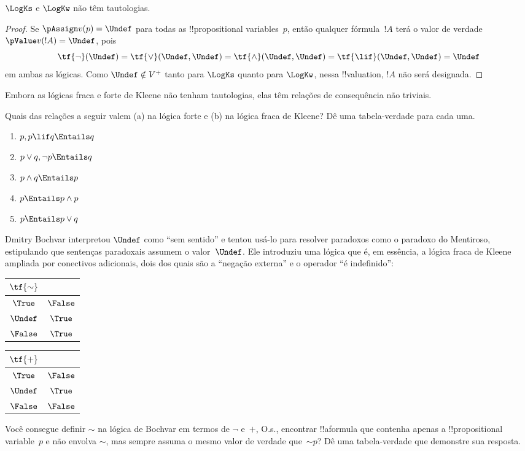 \documentclass[../../../include/open-logic-section]{subfiles}
\begin{document}
\begin{prop}
  $\LogKs$ e $\LogKw$ não têm tautologias.
\end{prop}

\begin{proof}
  Se $\pAssign v(p) = \Undef$ para todas as !!{propositional variable}s~$p$,
  então qualquer fórmula~$!A$ terá o valor de verdade~$\pValue v(!A) =
  \Undef$, pois
  \[
    \tf{\lnot}(\Undef) = \tf{\lor}(\Undef, \Undef) = \tf{\land}(\Undef,
  \Undef) = \tf{\lif}(\Undef, \Undef) = \Undef
  \]
  em ambas as lógicas. Como $\Undef \notin V^+$ tanto para $\LogKs$ quanto para
  $\LogKw$, nessa !!{valuation}, $!A$ não será designada.
\end{proof}

Embora as lógicas fraca e forte de Kleene não tenham tautologias, elas
têm relações de consequência não triviais. 

\begin{prob}
  Quais das relações a seguir valem (a) na lógica forte e
  (b) na lógica fraca de Kleene? Dê uma tabela-verdade para cada uma.
  \begin{enumerate}
    \item $p, p \lif q \Entails q$
    \item $p \lor q, \lnot p \Entails q$
    \item $p \land q \Entails p$
    \item $p \Entails p \land p$
    \item $p \Entails p \lor q$
  \end{enumerate}
\end{prob}

Dmitry Bochvar interpretou $\Undef$ como ``sem sentido'' e tentou
usá-lo para resolver paradoxos como o paradoxo do Mentiroso, estipulando
que sentenças paradoxais assumem o valor~$\Undef$. Ele introduziu uma
lógica que é, em essência, a lógica fraca de Kleene ampliada por conectivos
adicionais, dois dos quais são a ``negação externa'' e o operador ``é
indefinido'':
\begin{center}
  \begin{tabular}{c|c} 
    $\tf{\sim}$ & \\ 
    \hline  
    $\True$ & $\False$ \\ 
    $\Undef$ & $\True$ \\
    $\False$ & $\True$ 
  \end{tabular}
\quad
  \begin{tabular}{c|c} 
    $\tf{+}$ & \\ 
    \hline  
    $\True$ & $\False$ \\ 
    $\Undef$ & $\True$ \\
    $\False$ & $\False$ 
  \end{tabular}
\end{center}

\begin{prob}
  Você consegue definir $\sim$ na lógica de Bochvar em termos de $\lnot$
  e~$+$, O.s.\@, encontrar !!a{formula} que contenha apenas a !!{propositional
  variable}~$p$ e não envolva $\sim$, mas sempre assuma o mesmo
  valor de verdade que~$\mathord{\sim}p$? Dê uma tabela-verdade que demonstre
  sua resposta.
\end{prob}
\end{document}
